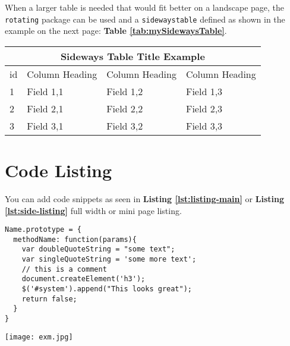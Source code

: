 When a larger table is needed that would fit better on a landscape page, the \texttt{rotating} package can be used and a \texttt{sidewaystable} defined as shown in the example on the next page: \textbf{Table \ref{tab:mySidewaysTable}}.

\begin{sidewaystable}
  \begin{tabular}{ |p{0.5cm}|p{7cm}|p{7cm}|p{7cm}|  } 
    \hline
        \multicolumn{4}{|c|}{Sideways Table Title Example} \\
     \hline
        \multicolumn{1}{|c|}{id} & 
        \multicolumn{1}{|c|}{Column Heading} & 
        \multicolumn{1}{|c|}{Column Heading} & 
        \multicolumn{1}{|c|}{Column Heading}  \\
     \hline
        1 & Field 1,1 & Field 1,2 & Field 1,3 \\
     \hline
        2 & Field 2,1 & Field 2,2 & Field 2,3 \\
     \hline
        3 & Field 3,1 & Field 3,2 & Field 3,3 \\
     \hline

  \end{tabular}
  \label{tab:mySidewaysTable}
\end{sidewaystable}


\section{Code Listing}
\label{sec:code-listing}

You can add code snippets as seen in \textbf{Listing \ref{lst:listing-main}} or \textbf{Listing \ref{lst:side-listing}} full width or mini page listing.

\begin{minipage}{.5\textwidth}
\begin{lstlisting}[caption=My Javascript Example]
Name.prototype = {
  methodName: function(params){
    var doubleQuoteString = "some text";
    var singleQuoteString = 'some more text';
    // this is a comment
    document.createElement('h3');
    $('#system').append("This looks great");
    return false;
  }
}
\end{lstlisting}
\label{lst:side-listing}
\end{minipage}%
\begin{minipage}{0.5\textwidth}
	\centering
	\texttt{[image: exm.jpg]}
	\caption{Right side image}
	\label{fig:right-side-minipage}
\end{minipage}

